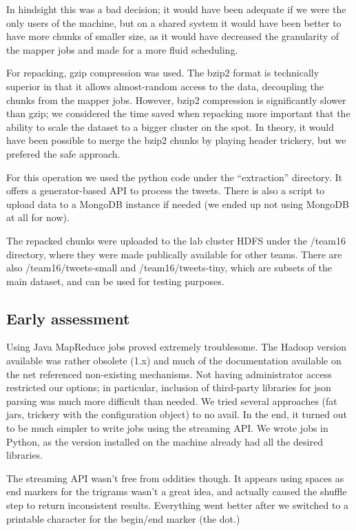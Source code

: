 \documentclass[a4paper,11pt]{article}
\begin{document}
In hindsight this was a bad decision; it would have been adequate if we were the only users of the machine, but on a shared system it would have been better to have more chunks of smaller size, as it would have decreased the granularity
of the mapper jobs and made for a more fluid scheduling.

For repacking, gzip compression was used. The bzip2 format is technically superior in that it allows almost-random access to the data, decoupling the chunks from the mapper jobs. However, bzip2 compression is significantly slower than gzip; we considered the time saved when repacking more important that the ability to scale the dataset to a bigger cluster on the spot. In theory, it would have been possible to merge the bzip2 chunks by playing header trickery, but we prefered the safe approach.

For this operation we used the python code under the ``extraction'' directory. It offers a generator-based API to process the tweets. There is also a script to upload data to a MongoDB instance if needed (we ended up not using MongoDB at all for now).

The repacked chunks were uploaded to the lab cluster HDFS under the /team16 directory, where they were made publically available for other teams. There are also /team16/tweets-small and /team16/tweets-tiny, which are subsets of the main dataset, and can be used for testing purposes.

\subsection{Early assessment}

Using Java MapReduce jobs proved extremely troublesome. The Hadoop version available was rather obsolete (1.x) and much of the documentation available on the net referenced non-existing mechanisms. Not having administrator access restricted our options; in particular, inclusion of third-party libraries for json parsing was much more difficult than needed. We tried several approaches (fat jars, trickery with the configuration object) to no avail. In the end, it turned out to be much simpler to write jobs using the streaming API. We wrote jobs in Python, as the version installed on the machine already had all the desired libraries.


The streaming API wasn't free from oddities though. It appears using spaces as end markers for the trigrams wasn't a great idea, and
actually caused the shuffle step to return inconsistent results. Everything went better after we switched to a printable character
for the begin/end marker (the dot.)
\end{document}

